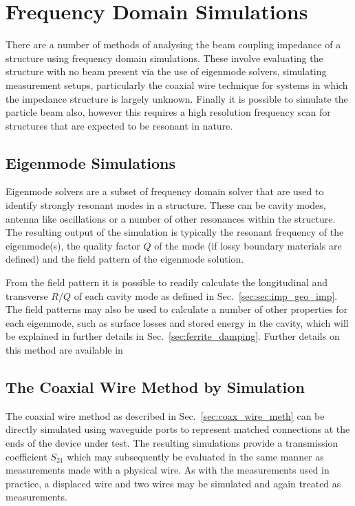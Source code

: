 \section{Frequency Domain Simulations}

There are a number of methods of analysing the beam coupling impedance of a structure using frequency domain simulations. These involve evaluating the structure with no beam present via the use of eigenmode solvers, simulating measurement setups, particularly the coaxial wire technique for systems in which the impedance structure is largely unknown. Finally it is possible to simulate the particle beam also, however this requires a high resolution frequency scan for structures that are expected to be resonant in nature.

\subsection{Eigenmode Simulations}

Eigenmode solvers are a subset of frequency domain solver that are used to identify strongly resonant modes in a structure. These can be cavity modes, antenna like oscillations or a number of other resonances within the structure. The resulting output of the simulation is typically the resonant frequency of the eigenmode(s), the quality factor $Q$ of the mode (if lossy boundary materials are defined) and the field pattern of the eigenmode solution.

From the field pattern it is possible to readily calculate the longitudinal and transverse $R/Q$ of each cavity mode as defined in Sec.~\ref{sec:sec:imp_geo_imp}. The field patterns may also be used to calculate a number of other properties for each eigenmode, such as surface losses and stored energy in the cavity, which will be explained in further details in Sec.~\ref{sec:ferrite_damping}. Further details on this method are available in \cite{Grudiev:LongTransSecCol}

\subsection{The Coaxial Wire Method by Simulation}

The coaxial wire method as described in Sec.~\ref{sec:coax_wire_meth} can be directly simulated using waveguide ports to represent matched connections at the ends of the device under test. The resulting simulations provide a transmission coefficient $S_{21}$ which may subsequently be evaluated in the same manner as measurements made with a physical wire. As with the measurements used in practice, a displaced wire and two wires may be simulated and again treated as measurements. 

